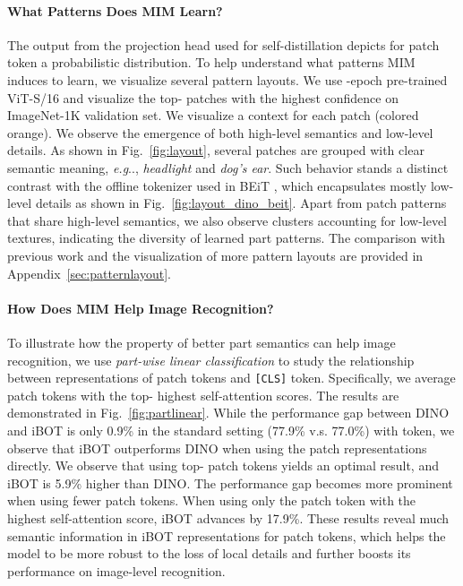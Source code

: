 \documentclass{article} \usepackage{iclr2022_conference,times}
\makeatletter
\def\ourmethod{{iBOT}\xspace}
\DeclareRobustCommand\onedot{\futurelet\@let@token\@onedot}
\def\@onedot{\ifx\@let@token.\else.\null\fi\xspace}
\def\eg{\emph{e.g}\onedot} \def\Eg{\emph{E.g}\onedot}
\makeatother
\begin{document}
\paragraph{What Patterns Does MIM Learn?} 
The output from the projection head used for self-distillation depicts for patch token a probabilistic distribution.
To help understand what patterns MIM induces to learn, we visualize several pattern layouts. 
We use -epoch pre-trained ViT-S/16 and visualize the top- patches with the highest confidence on ImageNet-1K validation set. We visualize a  context for each  patch (colored orange). 
We observe the emergence of both high-level semantics and low-level details.
As shown in Fig.~\ref{fig:layout}, several patches are grouped with clear semantic meaning, \eg, \textit{headlight} and \textit{dog's ear}. 
Such behavior stands a distinct contrast with the offline tokenizer used in BEiT \citep{beit}, which encapsulates mostly low-level details as shown in Fig.~\ref{fig:layout_dino_beit}. 
Apart from patch patterns that share high-level semantics, we also observe clusters accounting for low-level textures, indicating the diversity of learned part patterns. 
The comparison with previous work \citep{dino, beit} and the visualization of more pattern layouts are provided in Appendix~\ref{sec:patternlayout}.

\paragraph{How Does MIM Help Image Recognition?} 
To illustrate how the property of better part semantics can help image recognition, we use \textit{part-wise linear classification} to study the relationship between representations of patch tokens and \texttt{[CLS]} token. Specifically, we average  patch tokens with the top- highest self-attention scores. 
The results are demonstrated in Fig.~\ref{fig:partlinear}. 
While the performance gap between DINO and \ourmethod is only 0.9\% in the standard setting (77.9\% v.s. 77.0\%) with  token, we observe that \ourmethod outperforms DINO when using the patch representations directly.
We observe that using top- patch tokens yields an optimal result, and \ourmethod is 5.9\% higher than DINO. 
The performance gap becomes more prominent when using fewer patch tokens. When using only the patch token with the highest self-attention score, \ourmethod advances by 17.9\%. 
These results reveal much semantic information in \ourmethod representations for patch tokens, which helps the model to be more robust to the loss of local details and further boosts its performance on image-level recognition.
\end{document}
